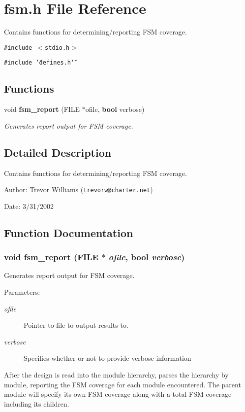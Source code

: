 \section{fsm.h File Reference}
\label{fsm_8h}
Contains functions for determining/reporting FSM coverage. 


{\tt \#include $<$stdio.h$>$}\par
{\tt \#include \char`\"{}defines.h\char`\"{}}\par
\subsection*{Functions}
\begin{CompactItemize}
\item 
void {\bf fsm\_\-report} (FILE $\ast$ofile, {\bf bool} verbose)
\begin{CompactList}\small\item\em Generates report output for FSM coverage.\item\end{CompactList}\end{CompactItemize}


\subsection{Detailed Description}
Contains functions for determining/reporting FSM coverage.

\begin{Desc}
\item[Author:]Trevor Williams ({\tt trevorw@charter.net}) \end{Desc}
\begin{Desc}
\item[Date:]3/31/2002 \end{Desc}


\subsection{Function Documentation}
\subsubsection{\setlength{\rightskip}{0pt plus 5cm}void fsm\_\-report (FILE $\ast$ {\em ofile}, {\bf bool} {\em verbose})}\label{fsm_8h_a0}


Generates report output for FSM coverage.

\begin{Desc}
\item[Parameters:]
\begin{description}
\item[{\em ofile}]Pointer to file to output results to. \item[{\em verbose}]Specifies whether or not to provide verbose information\end{description}
\end{Desc}
After the design is read into the module hierarchy, parses the hierarchy by module, reporting the FSM coverage for each module encountered. The parent module will specify its own FSM coverage along with a total FSM coverage including its children. 